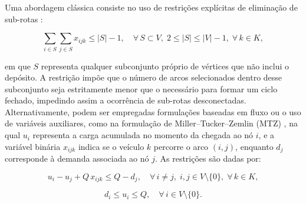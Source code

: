 Uma abordagem clássica consiste no uso de restrições explícitas de eliminação de sub-rotas \cite{dantzig2009solution}:


\begin{equation}
    \sum_{i \in S} \sum_{j \in S} x_{ijk} \leq |S| - 1, 
    \quad \forall\, S \subset V,\; 2 \leq |S| \leq |V| - 1,\; \forall\, k \in K,
    \label{eq:subciclo}
\end{equation}



\noindent em que $S$ representa qualquer subconjunto próprio de vértices que não inclui o depósito. A restrição impõe que o número de arcos selecionados dentro desse subconjunto seja estritamente menor que o necessário para formar um ciclo fechado, impedindo assim a ocorrência de sub-rotas desconectadas. Alternativamente, podem ser empregadas formulações baseadas em fluxo ou o uso de variáveis auxiliares, como na formulação de Miller--Tucker--Zemlin (MTZ) \cite{miller1960integer}, na qual $u_i$ representa a carga acumulada no momento da chegada ao nó $i$, e a variável binária $x_{ijk}$ indica se o veículo $k$ percorre o arco $(i,j)$, enquanto $d_j$ corresponde à demanda associada ao nó $j$. As restrições são dadas por:

\begin{equation}
    u_i - u_j + Q\, x_{ijk} \leq Q - d_j, 
    \quad \forall\, i \neq j,\; i,j \in V \setminus \{0\},\; \forall\, k \in K,
    \label{eq:mtz1}
\end{equation}

\begin{equation}
    d_i \leq u_i \leq Q, \quad \forall\, i \in V \setminus \{0\}.
    \label{eq:mtz2}
\end{equation}

